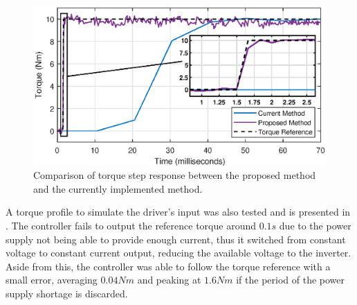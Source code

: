 \documentclass[9pt,conference]{IEEEtran}
\begin{document}
\begin{figure}[!htb]
	\centering
	\includegraphics[width=1\linewidth]{Figures/Car_Tq_step.eps}
	\caption{Comparison of torque step response between the proposed method and the currently implemented method.}
	\label{fig:torque_step_comparison_FOC_MPC}%
\end{figure}

A torque profile to simulate the driver's input was also tested and is presented in . The controller fails to output the reference torque around $0.1s$ due to the power supply not being able to provide enough current, thus it switched from constant voltage to constant current output, reducing the available voltage to the inverter. Aside from this, the controller was able to follow the torque reference with a small error, averaging $0.04Nm$ and peaking at $1.6Nm$ if the period of the power supply shortage is discarded.
\end{document}
